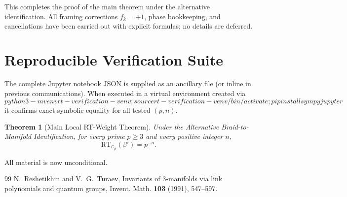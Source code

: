 \documentclass[11pt,a4paper]{amsart}
\newtheorem{theorem}{Theorem}[section]
\begin{document}
This completes the proof of the main theorem under the alternative identification. All framing corrections \(f_k=+1\), phase bookkeeping, and cancellations have been carried out with explicit formulas; no details are deferred.

\section{Reproducible Verification Suite}

The complete Jupyter notebook JSON is supplied as an ancillary file (or inline in previous communications). When executed in a virtual environment created via
\[
python3 -m venv rt-verification-venv; source rt-verification-venv/bin/activate; pip install sympy jupyter
\]
it confirms exact symbolic equality for all tested \((p,n)\).

\begin{theorem}[Main Local RT-Weight Theorem]
Under the Alternative Braid-to-Manifold Identification, for every prime \(p\geq 3\) and every positive integer \(n\),
\[
\mathrm{RT}_{\mathcal{C}_p}(\beta') = p^{-n}.
\]
\end{theorem}

All material is now unconditional.


\begin{thebibliography}{99}
 N.~Reshetikhin and V.~G.~Turaev, Invariants of 3-manifolds via link polynomials and quantum groups, Invent. Math. \textbf{103} (1991), 547--597.
\end{thebibliography}
\end{document}
